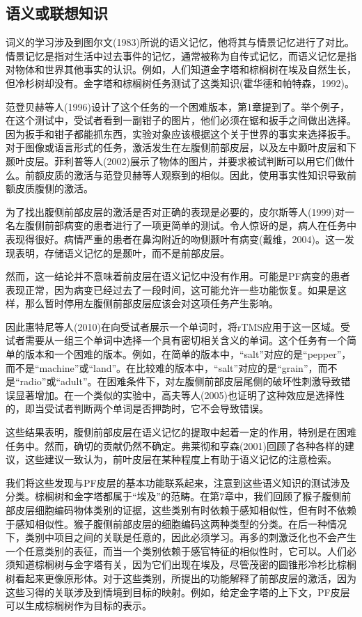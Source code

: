 \subsection{语义或联想知识}
\par
词义的学习涉及到图尔文(1983)所说的语义记忆，他将其与情景记忆进行了对比。情景记忆是指对生活中过去事件的记忆，通常被称为自传式记忆，而语义记忆是指对物体和世界其他事实的认识。例如，人们知道金字塔和棕榈树在埃及自然生长，但冷杉树却没有。金字塔和棕榈树任务测试了这类知识(霍华德和帕特森，1992)。
\par
范登贝赫等人(1996)设计了这个任务的一个困难版本，第1章提到了。举个例子，在这个测试中，受试者看到一副钳子的图片，他们必须在锯和扳手之间做出选择。因为扳手和钳子都能抓东西，实验对象应该根据这个关于世界的事实来选择扳手。对于图像或语言形式的任务，激活发生在左腹侧前部皮层，以及左中颞叶皮层和下颞叶皮层。菲利普等人(2002)展示了物体的图片，并要求被试判断可以用它们做什么。前额皮质的激活与范登贝赫等人观察到的相似。因此，使用事实性知识导致前额皮质腹侧的激活。
\par
为了找出腹侧前部皮层的激活是否对正确的表现是必要的，皮尔斯等人(1999)对一名左腹侧前部病变的患者进行了一项更简单的测试。令人惊讶的是，病人在任务中表现得很好。病情严重的患者在鼻沟附近的吻侧颞叶有病变(戴维，2004)。这一发现表明，存储语义记忆的是颞叶，而不是前部皮层。
\par
然而，这一结论并不意味着前皮层在语义记忆中没有作用。可能是PF病变的患者表现正常，因为病变已经过去了一段时间，这可能允许一些功能恢复。如果是这样，那么暂时停用左腹侧前部皮层应该会对这项任务产生影响。
\par
因此惠特尼等人(2010)在向受试者展示一个单词时，将rTMS应用于这一区域。受试者需要从一组三个单词中选择一个具有密切相关含义的单词。这个任务有一个简单的版本和一个困难的版本。例如，在简单的版本中，“salt”对应的是“pepper”，而不是“machine”或“land”。在比较难的版本中，“salt”对应的是“grain”，而不是“radio”或“adult”。在困难条件下，对左腹侧前部皮层尾侧的破坏性刺激导致错误显著增加。在一个类似的实验中，高夫等人(2005)也证明了这种效应是选择性的，即当受试者判断两个单词是否押韵时，它不会导致错误。
\par
这些结果表明，腹侧前部皮层在语义记忆的提取中起着一定的作用，特别是在困难任务中。然而，确切的贡献仍然不确定。弗莱彻和亨森(2001)回顾了各种各样的建议，这些建议一致认为，前叶皮层在某种程度上有助于语义记忆的注意检索。
\par
我们将这些发现与PF皮层的基本功能联系起来，注意到这些语义知识的测试涉及分类。棕榈树和金字塔都属于“埃及”的范畴。在第7章中，我们回顾了猴子腹侧前部皮层细胞编码物体类别的证据，这些类别有时依赖于感知相似性，但有时不依赖于感知相似性。猴子腹侧前部皮层的细胞编码这两种类型的分类。在后一种情况下，类别中项目之间的关联是任意的，因此必须学习。再多的刺激泛化也不会产生一个任意类别的表征，而当一个类别依赖于感官特征的相似性时，它可以。人们必须知道棕榈树与金字塔有关，因为它们出现在埃及，尽管茂密的圆锥形冷杉比棕榈树看起来更像原形体。对于这些类别，所提出的功能解释了前部皮层的激活，因为这些习得的关联涉及到情境到目标的映射。例如，给定金字塔的上下文，PF皮层可以生成棕榈树作为目标的表示。
